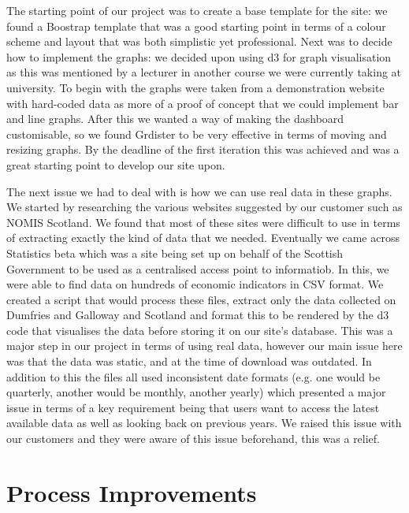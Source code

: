 \documentclass{l3proj}
\begin{document}
The starting point of our project was to create a base template for the site: we found a Boostrap template that was a good starting
point in terms of a colour scheme and layout that was both simplistic yet professional. Next was to decide how to implement the
graphs: we decided upon using d3 for graph visualisation as this was mentioned by a lecturer in another course we were currently
taking at university. To begin with the graphs were taken from a demonstration website with hard-coded data as more of a proof
of concept that we could implement bar and line graphs. After this we wanted a way of making the dashboard customisable, so we
found Grdister to be very effective in terms of moving and resizing graphs. By the deadline of the first iteration this was
achieved and was a great starting point to develop our site upon.

The next issue we had to deal with is how we can use real data in these graphs. We started by researching the various websites
suggested by our customer such as NOMIS Scotland. We found that most of these sites were difficult to use in terms of extracting
exactly the kind of data that we needed. Eventually we came across Statistics beta which was a site being set up on behalf of
the Scottish Government to be used as a centralised access point to informatiob. In this, we were able to find data on
hundreds of economic indicators in CSV format. We created a script that would process these files, extract only the data collected
on Dumfries and Galloway and Scotland and format this to be rendered by the d3 code that visualises the data before storing it on
our site's database. This was a major step in our project in terms of using real data, however our main issue here was that the
data was static, and at the time of download was outdated. In addition to this the files all used inconsistent date formats (e.g.
one would be quarterly, another would be monthly, another yearly) which presented a major issue in terms of a key requirement
being that users want to access the latest available data as well as looking back on previous years. We raised this issue
with our customers and they were aware of this issue beforehand, this was a relief.



\section{Process Improvements}
\label{managing}
\end{document}
